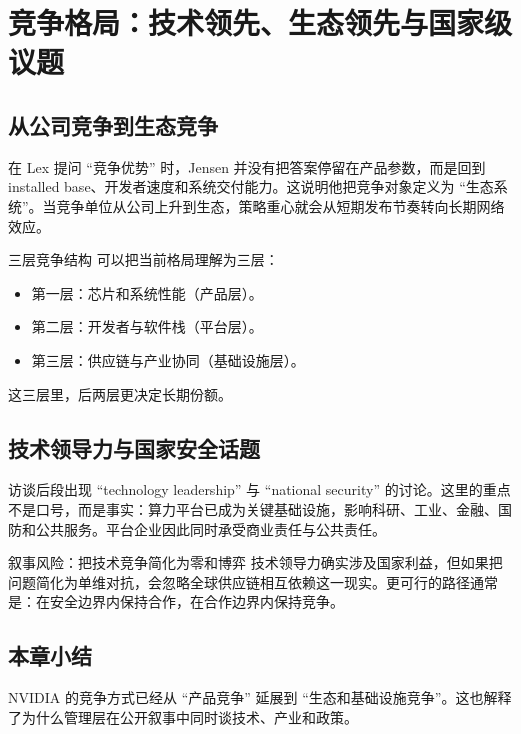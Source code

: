 \section{竞争格局：技术领先、生态领先与国家级议题}

\subsection{从公司竞争到生态竞争}

在 Lex 提问 ``竞争优势'' 时，Jensen 并没有把答案停留在产品参数，而是回到 installed base、开发者速度和系统交付能力。这说明他把竞争对象定义为 ``生态系统''。当竞争单位从公司上升到生态，策略重心就会从短期发布节奏转向长期网络效应。

\begin{knowledgebox}{三层竞争结构}
可以把当前格局理解为三层：
\begin{itemize}
    \item 第一层：芯片和系统性能（产品层）。
    \item 第二层：开发者与软件栈（平台层）。
    \item 第三层：供应链与产业协同（基础设施层）。
\end{itemize}
这三层里，后两层更决定长期份额。
\end{knowledgebox}

\subsection{技术领导力与国家安全话题}

访谈后段出现 ``technology leadership'' 与 ``national security'' 的讨论。这里的重点不是口号，而是事实：算力平台已成为关键基础设施，影响科研、工业、金融、国防和公共服务。平台企业因此同时承受商业责任与公共责任。

\begin{warningbox}{叙事风险：把技术竞争简化为零和博弈}
技术领导力确实涉及国家利益，但如果把问题简化为单维对抗，会忽略全球供应链相互依赖这一现实。更可行的路径通常是：在安全边界内保持合作，在合作边界内保持竞争。
\end{warningbox}

\subsection{本章小结}

NVIDIA 的竞争方式已经从 ``产品竞争'' 延展到 ``生态和基础设施竞争''。这也解释了为什么管理层在公开叙事中同时谈技术、产业和政策。

